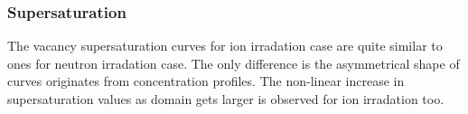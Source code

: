 \documentclass[a4paper]{article}
\begin{document}
    \newpage
    \subsubsection{Supersaturation} \hspace{10pt}

    The vacancy supersaturation curves for ion irradation case are quite similar to ones for neutron irradation case. The only difference is the asymmetrical shape of curves originates from concentration profiles. The non-linear increase in supersaturation values as domain gets larger is observed for ion irradation too.
      \begin{figure}[h!]  %
        \centering
        \qquad

\end{figure}
\end{document}
